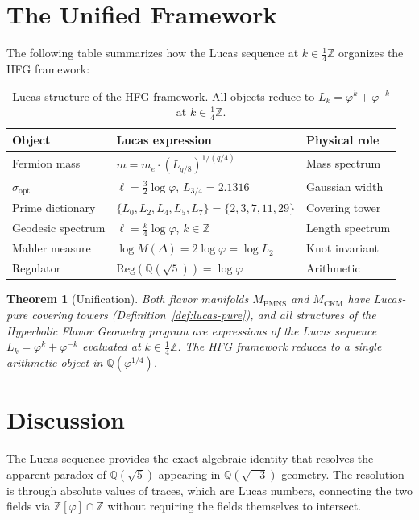 \documentclass[12pt]{article}
\newtheorem{theorem}{Theorem}
\theoremstyle{definition}
\newcommand{\Z}{\mathbb{Z}}
\newcommand{\Q}{\mathbb{Q}}
\newcommand{\ph}{\varphi}
\newcommand{\logph}{\log\ph}
\begin{document}
\section{The Unified Framework}

The following table summarizes how the Lucas sequence at
$k \in \frac{1}{4}\Z$ organizes the HFG framework:

\begin{table}[h]
\centering
\caption{Lucas structure of the HFG framework. All objects reduce to $L_k = \ph^k + \ph^{-k}$ at $k \in \frac{1}{4}\Z$.}
\label{tab:unified}
\begin{tabular}{lll}
\toprule
Object & Lucas expression & Physical role \\
\midrule
Fermion mass & $m = m_e \cdot (L_{q/8})^{1/(q/4)}$ & Mass spectrum \\
$\sigma_{\mathrm{opt}}$ & $\ell = \tfrac{3}{2}\logph$, $L_{3/4}=2.1316$ & Gaussian width \\
Prime dictionary & $\{L_0,L_2,L_4,L_5,L_7\} = \{2,3,7,11,29\}$ & Covering tower \\
Geodesic spectrum & $\ell = \tfrac{k}{4}\logph$, $k \in \Z$ & Length spectrum \\
Mahler measure & $\log M(\Delta) = 2\logph = \log L_2$ & Knot invariant \\
Regulator & $\mathrm{Reg}(\Q(\sqrt{5})) = \logph$ & Arithmetic \\
\bottomrule
\end{tabular}
\end{table}

\begin{theorem}[Unification]
Both flavor manifolds $M_{\mathrm{PMNS}}$ and $M_{\mathrm{CKM}}$ have Lucas-pure covering towers
(Definition~\ref{def:lucas-pure}), and all structures of the Hyperbolic Flavor Geometry program are
expressions of the Lucas sequence $L_k = \ph^k + \ph^{-k}$
evaluated at $k \in \frac{1}{4}\Z$. The HFG framework reduces
to a single arithmetic object in $\Q(\ph^{1/4})$.
\end{theorem}

\section{Discussion}

The Lucas sequence provides the exact algebraic identity that
resolves the apparent paradox of $\Q(\sqrt{5})$ appearing in
$\Q(\sqrt{-3})$ geometry. The resolution is through absolute
values of traces, which are Lucas numbers, connecting the two
fields via $\Z[\ph] \cap \Z$ without requiring the fields
themselves to intersect.
\end{document}
